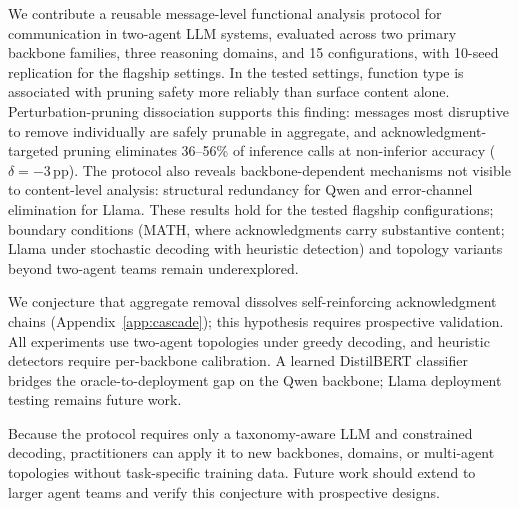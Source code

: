 We contribute a reusable message-level functional analysis protocol for communication in two-agent LLM systems, evaluated across two primary backbone families, three reasoning domains, and 15 configurations, with 10-seed replication for the flagship settings. In the tested settings, function type is associated with pruning safety more reliably than surface content alone. Perturbation-pruning dissociation supports this finding: messages most disruptive to remove individually are safely prunable in aggregate, and acknowledgment-targeted pruning eliminates 36--56\% of inference calls at non-inferior accuracy ($\delta{=}{-}3$\,pp). The protocol also reveals backbone-dependent mechanisms not visible to content-level analysis: structural redundancy for Qwen and error-channel elimination for Llama. These results hold for the tested flagship configurations; boundary conditions (MATH, where acknowledgments carry substantive content; Llama under stochastic decoding with heuristic detection) and topology variants beyond two-agent teams remain underexplored.

We conjecture that aggregate removal dissolves self-reinforcing acknowledgment chains (Appendix~\ref{app:cascade}); this hypothesis requires prospective validation. All experiments use two-agent topologies under greedy decoding, and heuristic detectors require per-backbone calibration. A learned DistilBERT classifier bridges the oracle-to-deployment gap on the Qwen backbone; Llama deployment testing remains future work.

Because the protocol requires only a taxonomy-aware LLM and constrained decoding, practitioners can apply it to new backbones, domains, or multi-agent topologies without task-specific training data. Future work should extend to larger agent teams and verify this conjecture with prospective designs.
